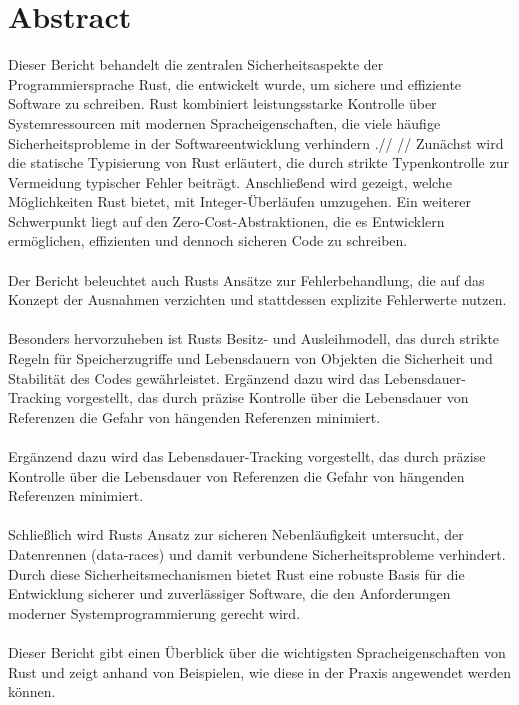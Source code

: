 \section*{Abstract}
\label{sec:abstract}

Dieser Bericht behandelt die zentralen Sicherheitsaspekte der Programmiersprache Rust, die entwickelt wurde, um sichere und effiziente Software zu schreiben. 
Rust kombiniert leistungsstarke Kontrolle über Systemressourcen mit modernen Spracheigenschaften, die viele häufige Sicherheitsprobleme in der Softwareentwicklung verhindern \cite{RustDoc2024}.//
//
Zunächst wird die statische Typisierung von Rust erläutert, die durch strikte Typenkontrolle zur Vermeidung typischer Fehler beiträgt. 
Anschließend wird gezeigt, welche Möglichkeiten Rust bietet, mit Integer-Überläufen umzugehen. 
Ein weiterer Schwerpunkt liegt auf den Zero-Cost-Abstraktionen, die es Entwicklern ermöglichen, effizienten und dennoch sicheren Code zu schreiben.\\
\\
Der Bericht beleuchtet auch Rusts Ansätze zur Fehlerbehandlung, die auf das Konzept der Ausnahmen verzichten und stattdessen explizite Fehlerwerte nutzen.\\
\\
Besonders hervorzuheben ist Rusts Besitz- und Ausleihmodell, das durch strikte Regeln für Speicherzugriffe und Lebensdauern von Objekten die Sicherheit und Stabilität des Codes gewährleistet. Ergänzend dazu wird das Lebensdauer-Tracking vorgestellt, das durch präzise Kontrolle über die Lebensdauer von Referenzen die Gefahr von hängenden Referenzen minimiert.\\
\\
Ergänzend dazu wird das Lebensdauer-Tracking vorgestellt, das durch präzise Kontrolle über die Lebensdauer von Referenzen die Gefahr von hängenden Referenzen minimiert.\\
\\
Schließlich wird Rusts Ansatz zur sicheren Nebenläufigkeit untersucht, der Datenrennen (\glspl{data-race}) und damit verbundene Sicherheitsprobleme verhindert. 
Durch diese Sicherheitsmechanismen bietet Rust eine robuste Basis für die Entwicklung sicherer und zuverlässiger Software, die den Anforderungen moderner Systemprogrammierung gerecht wird.\\
\\
Dieser Bericht gibt einen Überblick über die wichtigsten Spracheigenschaften von Rust und zeigt anhand von Beispielen, wie diese in der Praxis angewendet werden können.
